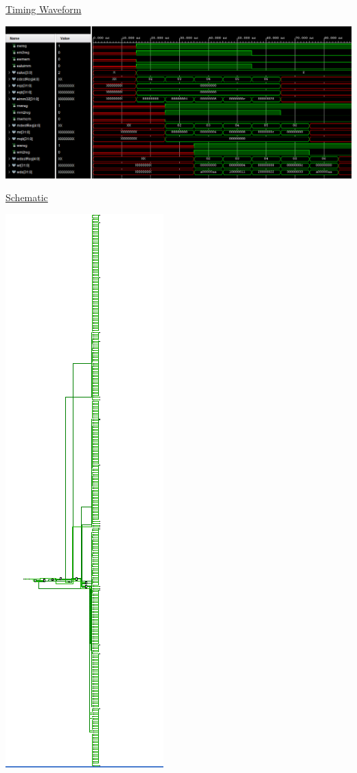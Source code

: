 \documentclass[11pt]{article}
\begin{document}
\begin{center}
    \underline{Timing Waveform}

    \includegraphics[width = 1\textwidth]{waveform.png}
    
    \newpage

    \underline{Schematic}

    \includegraphics[scale = 1]{schematic.png}


\end{center}
\end{document}
